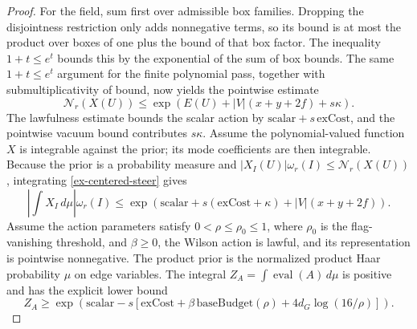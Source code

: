 \begin{proof}
For the field, sum first over admissible box families. Dropping the disjointness restriction only adds nonnegative terms, so its bound is at most the product over boxes of one plus the bound of that box factor. The inequality $1+t\leq e^t$ bounds this by the exponential of the sum of box bounds. The same $1+t\leq e^t$ argument for the finite polynomial pass, together with submultiplicativity of bound, now yields the pointwise estimate
\begin{equation}\label{ex-centered-steer}
 \mathcal N_r(X(U))\leq
 \exp\!\left(E(U)+|V|(x+y+2f)+s\kappa\right).
\end{equation}
The lawfulness estimate bounds the scalar action by $\mathrm{scalar}+s\,\mathrm{exCost}$, and the pointwise vacuum bound contributes $s\kappa$. Assume the polynomial-valued function $X$ is integrable against the prior; its mode coefficients are then integrable. Because the prior is a probability measure and $|X_I(U)|\omega_r(I)\leq\mathcal N_r(X(U))$, integrating \eqref{ex-centered-steer} gives
\[
 \left|\int X_I\,d\mu\right|\omega_r(I)
 \leq \exp\!\left(\mathrm{scalar}+s(\mathrm{exCost}+\kappa)+|V|(x+y+2f)\right).
\]
Assume the action parameters satisfy $0<\rho\leq\rho_0\leq1$, where $\rho_0$ is the flag-vanishing threshold, and $\beta\geq0$, the Wilson action is lawful, and its representation is pointwise nonnegative. The product prior is the normalized product Haar probability $\mu$ on edge variables. The integral $Z_A=\int\operatorname{eval}(A)\,d\mu$ is positive and has the explicit lower bound
\[
 Z_A\geq\exp\!\left(\mathrm{scalar}-s\left[\mathrm{exCost}
 +\beta\,\mathrm{baseBudget}(\rho)+4d_G\log(16/\rho)\right]\right).
\]

\end{proof}

